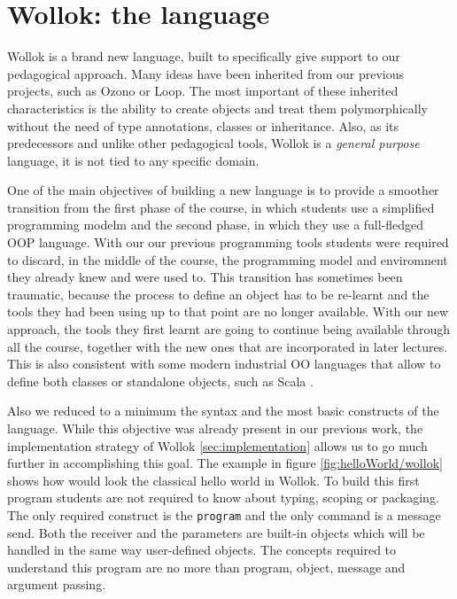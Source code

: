 \section{Wollok: the language}
\label{sec:wollokLanguage}


Wollok is a brand new language, built to specifically give support to our pedagogical approach.
Many ideas have been inherited from our previous projects, such as Ozono or Loop. 
The most important of these inherited characteristics is the ability to create objects and treat them polymorphically without the need of type annotations, classes or inheritance.
Also, as its predecessors and unlike other pedagogical tools, Wollok is a \emph{general purpose} language, \ie it is not tied to any specific domain.

\medskip
One of the main objectives of building a new language is to provide a smoother transition from the first phase of the course,
in which students use a simplified programming modelm and the second phase, in which they use a full-fledged OOP language.
With our our previous programming tools students were required to discard, in the middle of the course, the programming model and enviromnent they already knew and were used to.
This transition has sometimes been traumatic, because the process to define an object has to be re-learnt and the tools they had been using up to that point are no longer available.
With our new approach, the tools they first learnt are going to continue being available through all the course, together with the new ones that are incorporated in later lectures.
This is also consistent with some modern industrial OO languages that allow to define both classes or standalone objects, such as Scala \cite{Oder04a}.


\medskip
Also we reduced to a minimum the syntax and the most basic constructs of the language.
While this objective was already present in our previous work, the implementation strategy of Wollok \cf \ref{sec:implementation} allows us to go much further in accomplishing this goal.
The example in figure \ref{fig:helloWorld/wollok} shows how would look the classical hello world in Wollok.
To build this first program students are not required to know about typing, scoping or packaging.
The only required construct is the \lstinline[language=Wollok]{program} and the only command is a message send.
Both the receiver and the parameters are built-in objects which will be handled in the same way user-defined objects.
The concepts required to understand this program are no more than program, object, message and argument passing.

